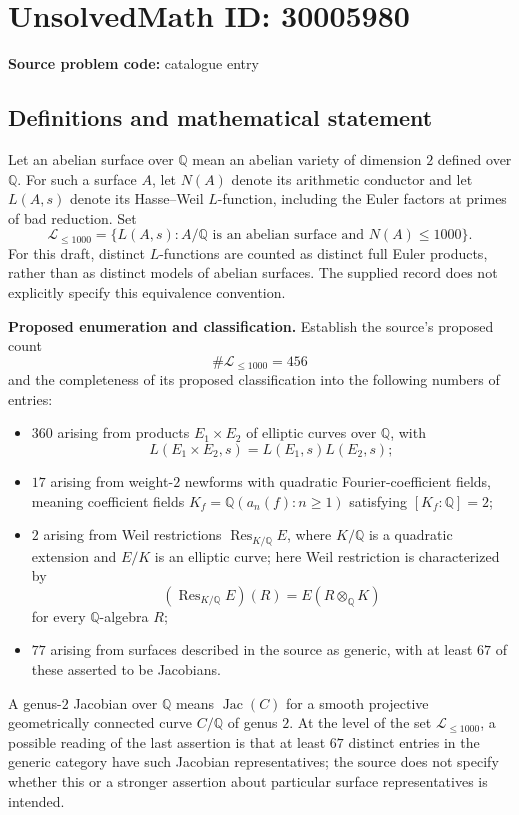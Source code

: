 \documentclass[11pt]{article}
\newcommand{\Q}{\mathbb{Q}}
\begin{document}
\section*{UnsolvedMath ID: 30005980}
\textbf{Source problem code:} catalogue entry
\subsection{Definitions and mathematical statement}
Let an abelian surface over \(\Q\) mean an abelian variety of dimension \(2\) defined over \(\Q\). For such a surface \(A\), let \(N(A)\) denote its arithmetic conductor and let \(L(A,s)\) denote its Hasse--Weil \(L\)-function, including the Euler factors at primes of bad reduction. Set
\[
\mathcal L_{\leq 1000}=\{L(A,s): A/\Q\text{ is an abelian surface and }N(A)\leq 1000\}.
\]
For this draft, distinct \(L\)-functions are counted as distinct full Euler products, rather than as distinct models of abelian surfaces. The supplied record does not explicitly specify this equivalence convention.

\textbf{Proposed enumeration and classification.} Establish the source's proposed count
\[
\#\mathcal L_{\leq 1000}=456
\]
and the completeness of its proposed classification into the following numbers of entries:
\begin{itemize}
\item \(360\) arising from products \(E_1\times E_2\) of elliptic curves over \(\Q\), with
\[
L(E_1\times E_2,s)=L(E_1,s)L(E_2,s);
\]
\item \(17\) arising from weight-\(2\) newforms with quadratic Fourier-coefficient fields, meaning coefficient fields \(K_f=\Q(a_n(f):n\geq1)\) satisfying \([K_f:\Q]=2\);
\item \(2\) arising from Weil restrictions \(\operatorname{Res}_{K/\Q}E\), where \(K/\Q\) is a quadratic extension and \(E/K\) is an elliptic curve; here Weil restriction is characterized by
\[
(\operatorname{Res}_{K/\Q}E)(R)=E(R\otimes_{\Q}K)
\]
for every \(\Q\)-algebra \(R\);
\item \(77\) arising from surfaces described in the source as generic, with at least \(67\) of these asserted to be Jacobians.
\end{itemize}
A genus-\(2\) Jacobian over \(\Q\) means \(\operatorname{Jac}(C)\) for a smooth projective geometrically connected curve \(C/\Q\) of genus \(2\). At the level of the set \(\mathcal L_{\leq1000}\), a possible reading of the last assertion is that at least \(67\) distinct entries in the generic category have such Jacobian representatives; the source does not specify whether this or a stronger assertion about particular surface representatives is intended.
\end{document}
